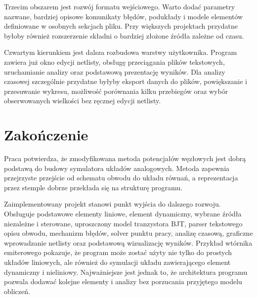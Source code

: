 Trzecim obszarem jest rozwój formatu wejściowego. Warto dodać parametry nazwane, bardziej opisowe komunikaty błędów, podukłady i modele elementów definiowane w osobnych sekcjach pliku. Przy większych projektach przydatne byłoby również rozszerzenie składni o bardziej złożone źródła zależne od czasu.

Czwartym kierunkiem jest dalsza rozbudowa warstwy użytkownika. Program zawiera już okno edycji netlisty, obsługę przeciągania plików tekstowych, uruchamianie analizy oraz podstawową prezentację wyników. Dla analizy czasowej szczególnie przydatne byłyby eksport danych do plików, powiększanie i przesuwanie wykresu, możliwość porównania kilku przebiegów oraz wybór obserwowanych wielkości bez ręcznej edycji netlisty.

\section{Zakończenie}
\label{sec:zakonczenie}

Praca potwierdza, że zmodyfikowana metoda potencjałów węzłowych jest dobrą podstawą do budowy symulatora układów analogowych. Metoda zapewnia przejrzyste przejście od schematu obwodu do układu równań, a reprezentacja przez stemple dobrze przekłada się na strukturę programu.

Zaimplementowany projekt stanowi punkt wyjścia do dalszego rozwoju. Obsługuje podstawowe elementy liniowe, element dynamiczny, wybrane źródła niezależne i sterowane, uproszczony model tranzystora BJT, parser tekstowego opisu obwodu, mechanizm błędów, solver punktu pracy, analizę czasową, graficzne wprowadzanie netlisty oraz podstawową wizualizację wyników. Przykład wtórnika emiterowego pokazuje, że program może zostać użyty nie tylko do prostych układów liniowych, ale również do symulacji układu zawierającego element dynamiczny i nieliniowy. Najważniejsze jest jednak to, że architektura programu pozwala dodawać kolejne elementy i analizy bez porzucania przyjętego modelu obliczeń.
